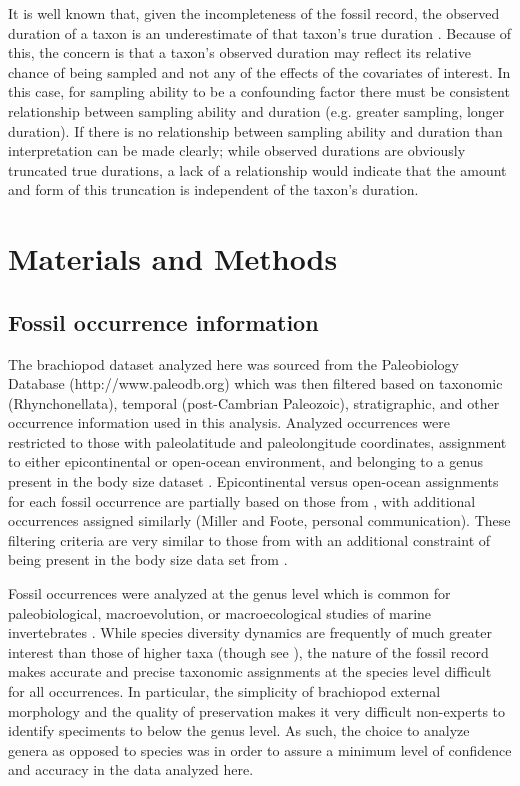\documentclass{article}
\begin{document}
It is well known that, given the incompleteness of the fossil record, the observed duration of a taxon is an underestimate of that taxon's true duration \citep{Solow1997,Wagner2013a,Wang2004,Liow2010b,Alroy2014a,Foote1996e}. Because of this, the concern is that a taxon's observed duration may reflect its relative chance of being sampled and not any of the effects of the covariates of interest. In this case, for sampling ability to be a confounding factor there must be consistent relationship between sampling ability and duration (e.g. greater sampling, longer duration). If there is no relationship between sampling ability and duration than interpretation can be made clearly; while observed durations are obviously truncated true durations, a lack of a relationship would indicate that the amount and form of this truncation is independent of the taxon's duration.



\section{Materials and Methods}

\subsection{Fossil occurrence information}

The brachiopod dataset analyzed here was sourced from the Paleobiology Database (http://www.paleodb.org) which was then filtered based on taxonomic (Rhynchonellata), temporal (post-Cambrian Paleozoic), stratigraphic, and other occurrence information used in this analysis. Analyzed occurrences were restricted to those with paleolatitude and paleolongitude coordinates, assignment to either epicontinental or open-ocean environment, and belonging to a genus present in the body size dataset \citep{Payne2014}. Epicontinental versus open-ocean assignments for each fossil occurrence are partially based on those from \citet{Miller2009a}, with additional occurrences assigned similarly (Miller and Foote, personal communication). These filtering criteria are very similar to those from \citet{Foote2013} with an additional constraint of being present in the body size data set from \citet{Payne2014}. 

Fossil occurrences were analyzed at the genus level which is common for paleobiological, macroevolution, or macroecological studies of marine invertebrates \citep{Alroy2010,Foote2013,Harnik2013,Kiessling2007a,Miller2009a,Nurnberg2013a,Nurnberg2015,Payne2007,Simpson2009,Vilhena2013}. While species diversity dynamics are frequently of much greater interest than those of higher taxa (though see \citealt{Foote2014b,Hoehn2015}), the nature of the fossil record makes accurate and precise taxonomic assignments at the species level difficult for all occurrences. In particular, the simplicity of brachiopod external morphology and the quality of preservation makes it very difficult non-experts to identify speciments to below the genus level. As such, the choice to analyze genera as opposed to species was in order to assure a minimum level of confidence and accuracy in the data analyzed here.
\end{document}
